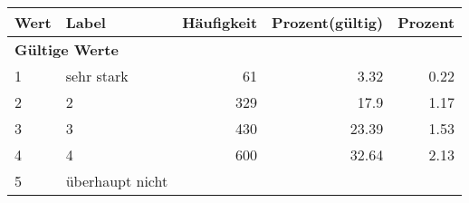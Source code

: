      \begin{longtable}{lXrrr}
     \toprule
     \textbf{Wert} & \textbf{Label} & \textbf{Häufigkeit} & \textbf{Prozent(gültig)} & \textbf{Prozent} \\
     \endhead
     \midrule
     \multicolumn{5}{l}{\textbf{Gültige Werte}}\\

     1 &
     \multicolumn{1}{X}{ sehr stark   } &


       \num{61} &
       \num[round-mode=places,round-precision=2]{3,32} &
         \num[round-mode=places,round-precision=2]{0,22} \\

     2 &
     \multicolumn{1}{X}{ 2   } &


       \num{329} &
       \num[round-mode=places,round-precision=2]{17,9} &
         \num[round-mode=places,round-precision=2]{1,17} \\

     3 &
     \multicolumn{1}{X}{ 3   } &


       \num{430} &
       \num[round-mode=places,round-precision=2]{23,39} &
         \num[round-mode=places,round-precision=2]{1,53} \\

     4 &
     \multicolumn{1}{X}{ 4   } &


       \num{600} &
       \num[round-mode=places,round-precision=2]{32,64} &
         \num[round-mode=places,round-precision=2]{2,13} \\

     5 &
     \multicolumn{1}{X}{ überhaupt nicht   } &



\end{longtable}
